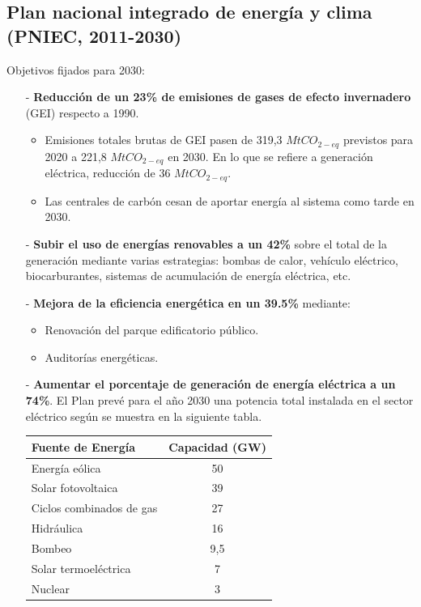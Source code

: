 	\subsection{Plan nacional integrado de energía y clima (PNIEC, 2011-2030)}
		Objetivos fijados para 2030:
		\begin{itemize}
			\item[-] 
				\textbf{Reducción de un 23\% de emisiones de gases de efecto invernadero} (GEI) respecto a 1990.
				\begin{itemize}
					\item 
						Emisiones totales brutas de GEI pasen de 319,3 $\textit{MtCO}_{2-eq}$ previstos para 2020 a 221,8 $\textit{MtCO}_{2-eq}$ en 2030. En lo que se refiere a generación eléctrica, reducción de 36 $\textit{MtCO}_{2-eq}$.
					\item 
						Las centrales de carbón cesan de aportar energía al sistema como tarde en 2030.
				\end{itemize}
				
			\item[-] 
				\textbf{Subir el uso de energías renovables a un 42\%} sobre el total de la generación mediante varias estrategias: bombas de calor, vehículo eléctrico, biocarburantes, sistemas de acumulación de energía eléctrica, etc.
				
			\item[-] 	
				\textbf{Mejora de la eficiencia energética en un 39.5\%} mediante:
				\begin{itemize}
					\item Renovación del parque edificatorio público.
					\item Auditorías energéticas.
				\end{itemize}
				
			\item[-] 
				\textbf{Aumentar el porcentaje de generación de energía eléctrica a un 74\%}. El Plan prevé para el año 2030 una potencia total instalada en el sector eléctrico según se muestra en la siguiente tabla.
				
				\begin{center}
					\begin{table}[H]
						\centering
						\begin{tabular}{lc}
							\textbf{Fuente de Energía} & \textbf{Capacidad (GW)} \\
							\hline
							Energía eólica & 50 \\
							Solar fotovoltaica & 39 \\
							Ciclos combinados de gas & 27 \\
							Hidráulica & 16 \\
							Bombeo & 9,5 \\
							Solar termoeléctrica & 7 \\
							Nuclear & 3
						\end{tabular}
					\end{table}
				\end{center}
				

\end{itemize}
